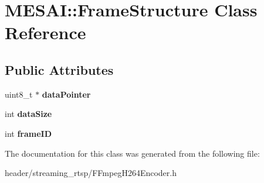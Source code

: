 \hypertarget{class_m_e_s_a_i_1_1_frame_structure}{}\section{M\+E\+S\+AI\+:\+:Frame\+Structure Class Reference}
\label{class_m_e_s_a_i_1_1_frame_structure}
\subsection*{Public Attributes}
\begin{DoxyCompactItemize}
\item 
\mbox{\label{class_m_e_s_a_i_1_1_frame_structure_a69fdf446d3c9212c62ecf845414a6391}} 
uint8\+\_\+t $\ast$ {\bfseries data\+Pointer}
\item 
\mbox{\label{class_m_e_s_a_i_1_1_frame_structure_ad5e93a14647887d6e5cba08bbde462ab}} 
int {\bfseries data\+Size}
\item 
\mbox{\label{class_m_e_s_a_i_1_1_frame_structure_ac2de50e7925e198c85597b593be5338a}} 
int {\bfseries frame\+ID}
\end{DoxyCompactItemize}


The documentation for this class was generated from the following file\+:\begin{DoxyCompactItemize}
\item 
header/streaming\+\_\+rtsp/F\+Fmpeg\+H264\+Encoder.\+h\end{DoxyCompactItemize}
